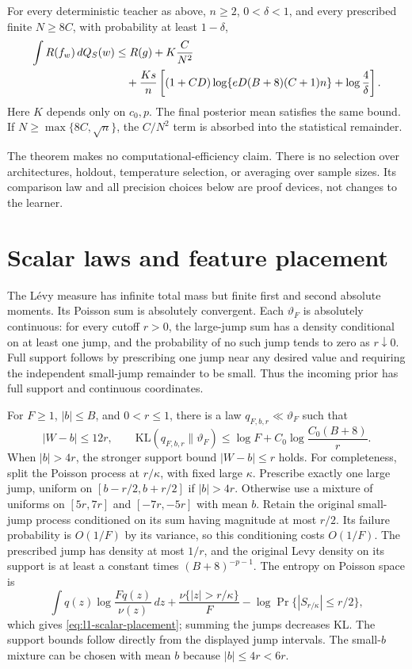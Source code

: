\begin{theorem}
\label{thm:l1-main}
For every deterministic teacher as above, $n\ge2$, $0<\delta<1$, and
every prescribed finite $N\ge8C$, with probability at least $1-\delta$,
\begin{align}
 \int R(f_w)\,dQ_S(w)
 &\le R(g)+K\frac C{N^2}\notag\\
 &\quad+\frac{Ks}{n}\left[(1+CD)\log\{eD(B+8)(C+1)n\}+\log\frac4\delta\right].
 \label{eq:sharp-main-bound}
\end{align}
Here $K$ depends only on $c_0,p$. The final posterior mean satisfies the
same bound. If $N\ge\max\{8C,\sqrt n\}$, the $C/N^2$ term is absorbed
into the statistical remainder.
\end{theorem}

The theorem makes no computational-efficiency claim. There is no
selection over architectures, holdout, temperature selection, or
averaging over sample sizes. Its comparison law and all precision
choices below are proof devices, not changes to the learner.

\section{Scalar laws and feature placement}
The L\'evy measure has infinite total mass but finite first and second
absolute moments. Its Poisson sum is absolutely convergent. Each
$\vartheta_F$ is absolutely continuous: for every cutoff $r>0$, the
large-jump sum has a density conditional on at least one jump, and the
probability of no such jump tends to zero as $r\downarrow0$. Full support
follows by prescribing one jump near any desired value and requiring
the independent small-jump remainder to be small. Thus the incoming
prior has full support and continuous coordinates.

For $F\ge1$, $|b|\le B$, and $0<r\le1$, there is a law
$q_{F,b,r}\ll\vartheta_F$ such that
\begin{equation}
 |W-b|\le12r,\qquad
 \mathrm{KL}(q_{F,b,r}\|\vartheta_F)
 \le\log F+C_0\log\frac{C_0(B+8)}r.
 \label{eq:l1-scalar-placement}
\end{equation}
When $|b|>4r$, the stronger support bound $|W-b|\le r$ holds.
For completeness, split the Poisson process at $r/\kappa$, with fixed
large $\kappa$. Prescribe exactly one large jump, uniform on
$[b-r/2,b+r/2]$ if $|b|>4r$. Otherwise use a mixture of uniforms on
$[5r,7r]$ and $[-7r,-5r]$ with mean $b$. Retain the original small-jump
process conditioned on its sum having magnitude at most $r/2$.
Its failure probability is $O(1/F)$ by its variance, so this conditioning
costs $O(1/F)$. The prescribed jump has density at most $1/r$, and the
original Levy density on its support is at least a constant times
$(B+8)^{-p-1}$. The entropy on Poisson space is
\[
 \int q(z)\log\frac{Fq(z)}{\nu(z)}\,dz
 +\frac{\nu\{|z|>r/\kappa\}}F
 -\log\Pr\{|S_{r/\kappa}|\le r/2\},
\]
which gives \eqref{eq:l1-scalar-placement}; summing the jumps decreases
KL. The support bounds follow directly from the displayed jump intervals.
The small-$b$ mixture can be chosen with mean $b$ because $|b|\le4r<6r$.

